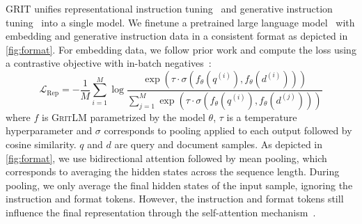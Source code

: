 \documentclass{article}
\newcommand{\model}{\textsc{GritLM}}
\newcommand{\method}{\textsc{GRIT}}
\begin{document}
\method{} unifies representational instruction tuning~\cite{su2023embedder,asai2022taskaware,wang2024improving} and generative instruction tuning~\cite{wei2022finetuned,sanh2022multitask,muennighoff2023crosslingual} into a single model. We finetune a pretrained large language model~\cite{brown2020language} with embedding and generative instruction data in a consistent format as depicted in \autoref{fig:format}. For embedding data, we follow prior work and compute the loss using a contrastive objective with in-batch negatives~\cite{chen2020simple,gao2022simcse}:
\begin{equation}\label{eq:rep}
\mathcal{L}_{\text{Rep}} = -\frac{1}{M}\sum_{i=1}^M\log\frac{\exp(\tau \cdot \sigma(f_{\theta}(q^{(i)}), f_{\theta}(d^{(i)})))}{\sum_{j=1}^M\exp(\tau \cdot \sigma(f_{\theta}(q^{(i)}), f_{\theta}(d^{(j)})))}
\end{equation}
where $f$ is \model{} parametrized by the model $\theta$, $\tau$ is a temperature hyperparameter and $\sigma$ corresponds to pooling applied to each output followed by cosine similarity. $q$ and $d$ are query and document samples. As depicted in \autoref{fig:format}, we use bidirectional attention followed by mean pooling, which corresponds to averaging the hidden states across the sequence length. During pooling, we only average the final hidden states of the input sample, ignoring the instruction and format tokens. However, the instruction and format tokens still influence the final representation through the self-attention mechanism~\cite{vaswani2023attention}. 
\end{document}
